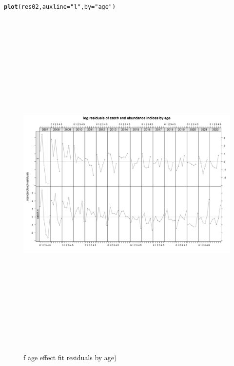 \documentclass[a4paper,english,11pt]{article}\usepackage[]{graphicx}\usepackage[]{xcolor}
\makeatletter
\newcommand{\hlsng}[1]{\textcolor[rgb]{0.192,0.494,0.8}{#1}}%
\newcommand{\hldef}[1]{\textcolor[rgb]{0.345,0.345,0.345}{#1}}%
\newcommand{\hlkwc}[1]{\textcolor[rgb]{0.333,0.667,0.333}{#1}}%
\newcommand{\hlkwd}[1]{\textcolor[rgb]{0.737,0.353,0.396}{\textbf{#1}}}%
\newenvironment{kframe}{%
 \def\at@end@of@kframe{}%
 \ifinner\ifhmode%
  \def\at@end@of@kframe{\end{minipage}}%
  \begin{minipage}{\columnwidth}%
 \fi\fi%
 \def\FrameCommand##1{\hskip\@totalleftmargin \hskip-\fboxsep
 \colorbox{shadecolor}{##1}\hskip-\fboxsep
     \hskip-\linewidth \hskip-\@totalleftmargin \hskip\columnwidth}%
 \MakeFramed {\advance\hsize-\width
   \@totalleftmargin\z@ \linewidth\hsize
   \@setminipage}}%
 {\par\unskip\endMakeFramed%
 \at@end@of@kframe}
\newenvironment{knitrout}{}{} %
\makeatother
\begin{document}
\begin{knitrout}
\color{fgcolor}\begin{kframe}
\begin{alltt}
\hlkwd{plot}\hldef{(res02,} \hlkwc{auxline} \hldef{=} \hlsng{"l"}\hldef{,} \hlkwc{by} \hldef{=} \hlsng{"age"}\hldef{)}
\end{alltt}
\end{kframe}\begin{figure}[H]

{\centering \includegraphics[width=25cm,height=18cm,angle=90]{figure/fageresbyage-1} 

}

\caption[f age effect fit residuals by age)]{f age effect fit residuals by age)}\label{fig:fageresbyage}
\end{figure}

\end{knitrout}
\end{document}
